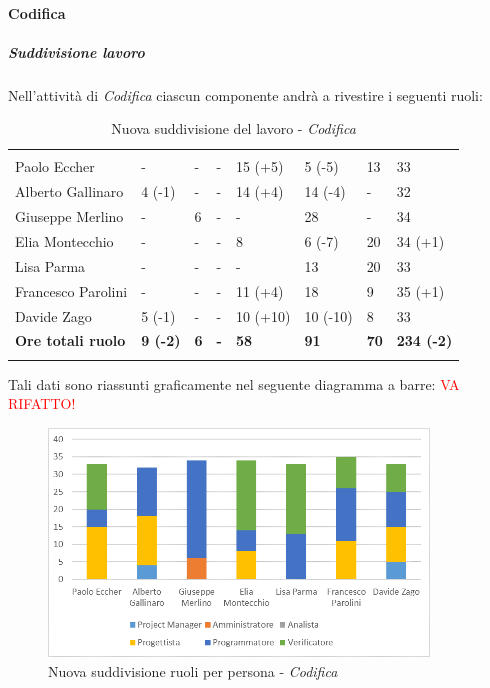\paragraph{Codifica}\Spazio
	\subparagraph{Suddivisione lavoro} \Spazio
	Nell'attività di \textit{Codifica} ciascun componente andrà a rivestire i seguenti ruoli:
	\begin{table}[H]
		\centering
		\begin{tabular}{|C{4cm}|C{0.8cm}|C{0.8cm}|C{0.8cm}|C{0.9cm}|C{0.9cm}|C{0.8cm}|C{2.5cm}|}
			 & & &&&&&\\
			Paolo Eccher      & - & - & - & 15 (+5) & 5 (-5) & 13 & 33 \\
			\hline
			Alberto Gallinaro & 4 (-1) & - & - & 14 (+4) & 14 (-4) & - & 32 \\
			\hline
			Giuseppe Merlino  & - & 6 & - & - & 28 & - & 34 \\
			\hline
			Elia Montecchio   & - & - & - & 8 & 6 (-7) & 20 & 34 (+1) \\
			\hline
			Lisa Parma        & - & - & - & - & 13 & 20 & 33 \\
			\hline
			Francesco Parolini& - & - & - & 11 (+4) & 18 & 9 & 35 (+1) \\
			\hline
			Davide Zago       & 5 (-1) & - & - & 10 (+10) & 10 (-10) & 8 & 33 \\
			\hline
			\textbf{Ore totali ruolo}  & \textbf{9 (-2)} & \textbf{6} & \textbf{-} & \textbf{58} & \textbf{91} & \textbf{70} & \textbf{234 (-2)} \\
		\end{tabular}
		\caption{Nuova suddivisione del lavoro - \textit{Codifica}}
	\end{table}
	
	Tali dati sono riassunti graficamente nel seguente diagramma a barre:
	\textcolor{red}{VA RIFATTO!}
	\begin{figure}[H] 
		\centering 
		\includegraphics[width=0.9\textwidth]{images/BarreCodificaNuova.png} 
		\caption{Nuova suddivisione ruoli per persona - \textit{Codifica}}
		\label{BarreCodifica}
	\end{figure}
	
